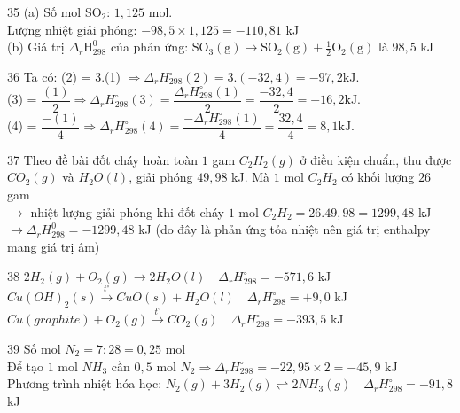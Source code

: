 \def\writeANS{}
\begin{loigiaibth}{35}
  (a) Số mol $\mathrm {SO}_2$: $1{,}125$ mol. \\ Lượng nhiệt giải phóng: $-98{,}5 \times 1{,}125 = -110{,}81$ kJ \\ (b) Giá trị $\Delta _r \mathrm {H}_{298}^0$ của phản ứng: $\mathrm {SO}_3\mathrm {(g)} \longrightarrow \mathrm {SO}_2\mathrm {(g)} + \frac {1}{2}\mathrm {O}_2\mathrm {(g)}$ là $98{,}5$ kJ
\end{loigiaibth}
\def\writeANS{}
\begin{loigiaibth}{36}
  Ta có: (2) = 3.(1) $\Rightarrow \Delta _r H_{298}^\circ (2) = 3.(-32{,}4) = -97{,}2 \mathrm {kJ}$. \\ (3) = $\dfrac {(1)}{2} \Rightarrow \Delta _r H_{298}^\circ (3) = \dfrac {\Delta _r H_{298}^\circ (1)}{2} = \dfrac {-32{,}4}{2} = -16{,}2 \mathrm {kJ}$. \\ (4) = $\dfrac {-(1)}{4} \Rightarrow \Delta _r H_{298}^\circ (4) = \dfrac {-\Delta _r H_{298}^\circ (1)}{4} = \dfrac {32{,}4}{4} = 8{,}1\mathrm {kJ}$.
\end{loigiaibth}
\def\writeANS{}
\begin{loigiaibth}{37}
  Theo đề bài đốt cháy hoàn toàn $1$ gam $C_2H_2(g)$ ở điều kiện chuẩn, thu được $CO_2(g)$ và $H_2O(l)$, giải phóng $49{,}98$ kJ. Mà $1$ mol $C_2H_2$ có khối lượng $26$ gam \\ $\rightarrow $ nhiệt lượng giải phóng khi đốt cháy $1$ mol $C_2H_2 = 26.49{,}98 = 1299{,}48$ kJ \\ $\rightarrow \Delta _r H_{298}^0 = -1299{,}48$ kJ (do đây là phản ứng tỏa nhiệt nên giá trị enthalpy mang giá trị âm)
\end{loigiaibth}
\def\writeANS{}
\begin{loigiaibth}{38}
  $2H_2(g) + O_2(g) \rightarrow 2H_2O(l) \quad \Delta _r H_{298}^\circ = -571{,}6$ kJ \\ $Cu(OH)_2(s) \xrightarrow {t^\circ } CuO(s) + H_2O(l) \quad \Delta _r H_{298}^\circ = +9{,}0$ kJ \\ $Cu(graphite) + O_2(g) \xrightarrow {t^\circ } CO_2(g) \quad \Delta _r H_{298}^\circ = -393{,}5$ kJ
\end{loigiaibth}
\def\writeANS{}
\begin{loigiaibth}{39}
  Số mol $N_2 = 7 : 28 = 0{,}25$ mol \\ Để tạo $1$ mol $NH_3$ cần $0{,}5$ mol $N_2 \Rightarrow \Delta _r H_{298}^\circ = -22{,}95 \times 2 = -45{,}9$ kJ \\ Phương trình nhiệt hóa học: $N_2(g) + 3H_2(g) \rightleftharpoons 2NH_3(g) \quad \Delta _r H_{298}^\circ = -91{,}8$ kJ
\end{loigiaibth}
